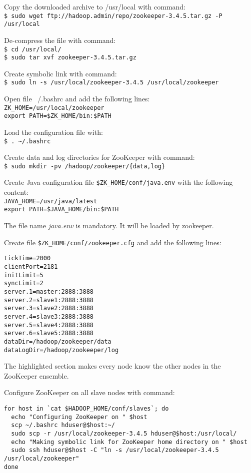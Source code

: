 Copy the downloaded archive to /usr/local with command: \\
\verb|$ sudo wget ftp://hadoop.admin/repo/zookeeper-3.4.5.tar.gz -P /usr/local|

De-compress the file with command: \\
\verb|$ cd /usr/local/| \\
\verb|$ sudo tar xvf zookeeper-3.4.5.tar.gz|

Create symbolic link with command:\\
\verb|$ sudo ln -s /usr/local/zookeeper-3.4.5 /usr/local/zookeeper|

Open file ~/.bashrc and add the following lines: \\
\verb|ZK_HOME=/usr/local/zookeeper| \\
\verb|export PATH=$ZK_HOME/bin:$PATH|

Load the configuration file with: \\
\verb|$ . ~/.bashrc|

Create data and log directories for ZooKeeper with command:\\
\verb|$ sudo mkdir -pv /hadoop/zookeeper/{data,log}|

Create Java configuration file \verb|$ZK_HOME/conf/java.env| with the following content:\\
\verb|JAVA_HOME=/usr/java/latest| \\
\verb|export PATH=$JAVA_HOME/bin:$PATH|

The file name \emph{java.env} is mandatory. It will be loaded by zookeeper.

Create file \verb|$ZK_HOME/conf/zookeeper.cfg| and add the following lines:
\begin{verbatim}
tickTime=2000
clientPort=2181
initLimit=5
syncLimit=2
server.1=master:2888:3888
server.2=slave1:2888:3888
server.3=slave2:2888:3888
server.4=slave3:2888:3888
server.5=slave4:2888:3888
server.6=slave5:2888:3888
dataDir=/hadoop/zookeeper/data
dataLogDir=/hadoop/zookeeper/log
\end{verbatim}

The highlighted section makes every node know the other nodes in the ZooKeeper ensemble.

Configure ZooKeeper on all slave nodes with command:
\begin{verbatim}
for host in `cat $HADOOP_HOME/conf/slaves`; do
  echo "Configuring ZooKeeper on " $host
  scp ~/.bashrc hduser@$host:~/
  sudo scp -r /usr/local/zookeeper-3.4.5 hduser@$host:/usr/local/
  echo "Making symbolic link for ZooKeeper home directory on " $host
  sudo ssh hduser@$host -C "ln -s /usr/local/zookeeper-3.4.5 /usr/local/zookeeper"
done
\end{verbatim}

